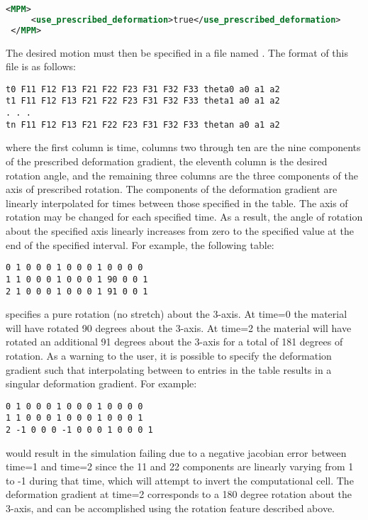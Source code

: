 \begin{lstlisting}[language=XML]
 <MPM>
     <use_prescribed_deformation>true</use_prescribed_deformation>
 </MPM>
\end{lstlisting}

The desired motion must then be specified in a file named .  The format of this file is as follows:

\begin{lstlisting}[backgroundcolor=\color{background}]
t0 F11 F12 F13 F21 F22 F23 F31 F32 F33 theta0 a0 a1 a2
t1 F11 F12 F13 F21 F22 F23 F31 F32 F33 theta1 a0 a1 a2
. . .
tn F11 F12 F13 F21 F22 F23 F31 F32 F33 thetan a0 a1 a2

\end{lstlisting}
where the first column is time, columns two through ten are the nine components of the prescribed deformation gradient, the eleventh column is the desired rotation angle, and the remaining three columns are the three components of the axis of prescribed rotation.  The components of the deformation gradient are linearly interpolated for times between those specified in the table.  The axis of rotation may be changed for each specified time.  As a result, the angle of rotation about the specified axis linearly increases from zero to the specified value at the end of the specified interval.  For example, the following table:

\begin{lstlisting}[backgroundcolor=\color{background}]
0 1 0 0 0 1 0 0 0 1 0 0 0 0
1 1 0 0 0 1 0 0 0 1 90 0 0 1
2 1 0 0 0 1 0 0 0 1 91 0 0 1
\end{lstlisting}
specifies a pure rotation (no stretch) about the 3-axis.  At time=0 the material will have rotated 90 degrees about the 3-axis.  At time=2 the material will have rotated an additional 91 degrees about the 3-axis for a total of 181 degrees of rotation.  As a warning to the user, it is possible to specify the deformation gradient such that interpolating between to entries in the table results in a singular deformation gradient.  For example:
\begin{lstlisting}[backgroundcolor=\color{background}]
0 1 0 0 0 1 0 0 0 1 0 0 0 0
1 1 0 0 0 1 0 0 0 1 0 0 0 1
2 -1 0 0 0 -1 0 0 0 1 0 0 0 1
\end{lstlisting}
would result in the simulation failing due to a negative jacobian error between time=1 and time=2 since the 11 and 22 components are linearly varying from 1 to -1 during that time, which will attempt to invert the computational cell.  The deformation gradient at time=2 corresponds to a 180 degree rotation about the 3-axis, and can be accomplished using the rotation feature described above.

